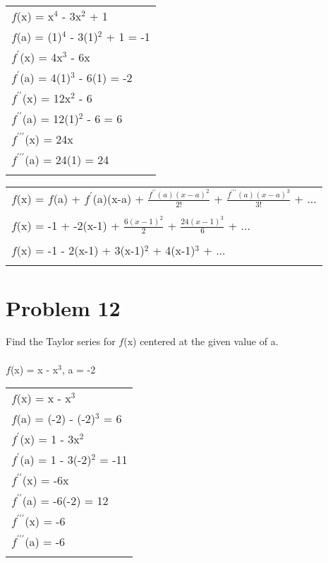 \documentclass{article} %
\begin{document}
    \begin{tabular}{l}
        $f$(x) = x$^4$ - 3x$^2$ + 1\\
        $f$(a) = (1)$^4$ - 3(1)$^2$ + 1 = -1\\
        $f^{\prime}$(x) = 4x$^3$ - 6x\\
        $f^{\prime}$(a) = 4(1)$^3$ - 6(1) = -2\\
        $f^{\prime\prime}$(x) = 12x$^2$ - 6\\
        $f^{\prime\prime}$(a) = 12(1)$^2$ - 6 = 6\\
        $f^{\prime\prime\prime}$(x) = 24x\\
        $f^{\prime\prime\prime}$(a) = 24(1) = 24\\\\  
    \end{tabular}
    
    \begin{tabular}{l}
        $f$(x) = $f$(a) + $f^{\prime}$(a)(x-a) + $\frac{f^{\prime\prime}(a)(x-a)^2}{2!}$ + $\frac{f^{\prime\prime\prime}(a)(x-a)^3}{3!}$ + ...\\\\
        $f$(x) = -1 + -2(x-1) + $\frac{6(x-1)^2}{2}$ + $\frac{24(x-1)^3}{6}$ + ...\\\\
        $f$(x) = -1 - 2(x-1) + 3(x-1)$^2$ + 4(x-1)$^3$ + ...\\\\   
    \end{tabular}
    

    \section*{Problem 12} %
    Find the Taylor series for $f$(x) centered at the given value of a.\\\\
    $f$(x) = x - x$^3$, a = -2\\

    \begin{tabular}{l}
        $f$(x) = x - x$^3$\\
        $f$(a) = (-2) - (-2)$^3$ = 6\\
        $f^{\prime}$(x) = 1 - 3x$^2$\\
        $f^{\prime}$(a) = 1 - 3(-2)$^2$ = -11\\
        $f^{\prime\prime}$(x) = -6x\\
        $f^{\prime\prime}$(a) = -6(-2) = 12\\
        $f^{\prime\prime\prime}$(x) = -6\\
        $f^{\prime\prime\prime}$(a) = -6\\\\  
    \end{tabular}
    
\end{document}
